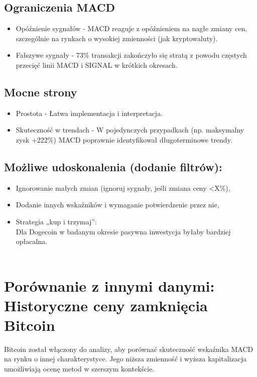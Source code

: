 \documentclass[a4paper,12pt]{article}
\begin{document}
\subsection{Ograniczenia MACD}
\begin{itemize}
    \item Opóźnienie sygnałów - MACD reaguje z opóźnieniem na nagłe zmiany cen, szczególnie na rynkach o wysokiej zmienności (jak kryptowaluty).
    \item Fałszywe sygnały - 73\% transakcji zakończyło się stratą z powodu częstych przecięć linii MACD i SIGNAL w krótkich okresach.
\end{itemize}

\subsection{Mocne strony}
\begin{itemize}
    \item Prostota - Łatwa implementacja i interpretacja.
    \item Skuteczność w trendach - W pojedynczych przypadkach (np. maksymalny zysk +222\%) MACD poprawnie identyfikował długoterminowe trendy.
\end{itemize}

\subsection{Możliwe udoskonalenia (dodanie filtrów):}
\begin{itemize}
    \item Ignorowanie małych zmian (ignoruj sygnały, jeśli zmiana ceny <X\%),
    \item Dodanie innych wskaźników i wymaganie potwierdzenie przez nie,
    \item Strategia „kup i trzymaj”:\\ Dla Dogecoin w badanym okresie pasywna inwestycja byłaby bardziej opłacalna. \\\\
\end{itemize}

\section{Porównanie z innymi danymi: Historyczne ceny zamknięcia Bitcoin}
Bitcoin został włączony do analizy,
aby porównać skuteczność wskaźnika MACD na rynku o innej charakterystyce. Jego niższa zmienność i
wyższa kapitalizacja umożliwiają ocenę metod w szerszym kontekście.
\end{document}
